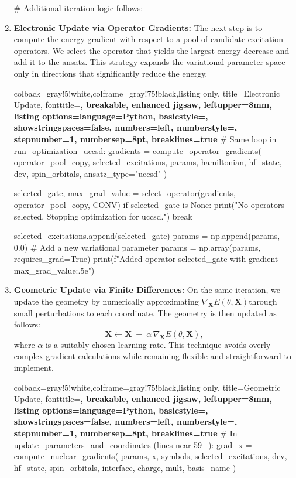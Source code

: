 \begin{enumerate}
\begin{tcblisting}
    # Additional iteration logic follows:
    \end{tcblisting}

    \item \textbf{Electronic Update via Operator Gradients:}
    The next step is to compute the energy gradient with respect to a pool of candidate excitation operators. We select the operator that yields the largest energy decrease and add it to the ansatz. This strategy expands the variational parameter space only in directions that significantly reduce the energy.
    \begin{tcblisting}{colback=gray!5!white,colframe=gray!75!black,listing only,
        title=Electronic Update, fonttitle=\bfseries, breakable, enhanced jigsaw, leftupper=8mm,
        listing options={language=Python, basicstyle=\ttfamily\small,
        showstringspaces=false, numbers=left, numberstyle=\footnotesize,
        stepnumber=1, numbersep=8pt, breaklines=true}}
# Same loop in run_optimization_uccsd:
gradients = compute_operator_gradients(
    operator_pool_copy,
    selected_excitations,
    params,
    hamiltonian,
    hf_state,
    dev,
    spin_orbitals,
    ansatz_type="uccsd"
)

selected_gate, max_grad_value = select_operator(gradients, operator_pool_copy, CONV)
if selected_gate is None:
    print("No operators selected. Stopping optimization for uccsd.")
    break

selected_excitations.append(selected_gate)
params = np.append(params, 0.0)  # Add a new variational parameter
params = np.array(params, requires_grad=True)
print(f"Added operator {selected_gate} with gradient {max_grad_value:.5e}")
    \end{tcblisting}

    \item \textbf{Geometric Update via Finite Differences:}
    On the same iteration, we update the geometry by numerically approximating \(\nabla_{\mathbf{X}}E(\theta, \mathbf{X})\)through small perturbations to each coordinate. The geometry is then updated as follows:
    \[
    \mathbf{X} \leftarrow \mathbf{X} \;-\; \alpha\, \nabla_{\mathbf{X}} E(\theta, \mathbf{X}),
    \]
    where \(\alpha\) is a suitably chosen learning rate. This technique avoids overly complex gradient calculations while remaining flexible and straightforward to implement.
    \begin{tcblisting}{colback=gray!5!white,colframe=gray!75!black,listing only,
        title=Geometric Update, fonttitle=\bfseries, breakable, enhanced jigsaw, leftupper=8mm,
        listing options={language=Python, basicstyle=\ttfamily\small,
        showstringspaces=false, numbers=left, numberstyle=\footnotesize,
        stepnumber=1, numbersep=8pt, breaklines=true}}
# In update_parameters_and_coordinates (lines near 59+):
grad_x = compute_nuclear_gradients(
    params, x, symbols, selected_excitations, dev,
    hf_state, spin_orbitals, interface, charge, mult, basis_name
)


\end{tcblisting}
\end{enumerate}
